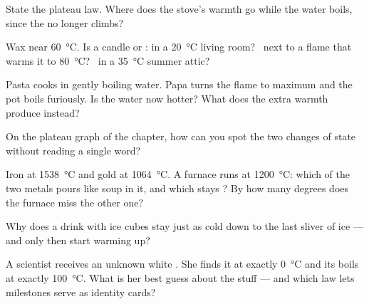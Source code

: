 \begin{exercise}[$\star$]\label{exo:g4:changes-of-state:4}
State the plateau law. Where does the stove's warmth go while the
water boils, since the  no longer climbs?
\end{exercise}

\begin{exercise}[$\star$]\label{exo:g4:changes-of-state:5}
Wax  near \qty{60}{\celsius}. Is a candle  or : in
a \qty{20}{\celsius} living room? \ next to a flame that warms it
to \qty{80}{\celsius}? \ in a \qty{35}{\celsius} summer attic?
\end{exercise}

\begin{exercise}[$\star$]\label{exo:g4:changes-of-state:6}
Pasta cooks in gently boiling water. Papa turns the flame to
maximum and the pot boils furiously. Is the water now hotter? What
does the extra warmth produce instead?
\end{exercise}

\begin{exercise}[$\star$]\label{exo:g4:changes-of-state:7}
On the plateau graph of the chapter, how can you spot the two
changes of state without reading a single word?
\end{exercise}

\begin{exercise}[$\star$]\label{exo:g4:changes-of-state:8}
Iron  at \qty{1538}{\celsius} and gold at \qty{1064}{\celsius}.
A furnace runs at \qty{1200}{\celsius}: which of the two metals
pours like soup in it, and which stays ? By how many degrees
does the furnace miss the other one?
\end{exercise}

\begin{exercise}[$\star$]\label{exo:g4:changes-of-state:9}
Why does a drink with ice cubes stay just as cold down to the last
sliver of ice --- and only then start warming up?
\end{exercise}

\begin{exercise}[$\star\star$]\label{exo:g4:changes-of-state:10}
A scientist receives an unknown white . She finds it  at
exactly \qty{0}{\celsius} and its  boils at exactly
\qty{100}{\celsius}. What is her best guess about the stuff --- and
which law lets milestones serve as identity cards?
\end{exercise}


